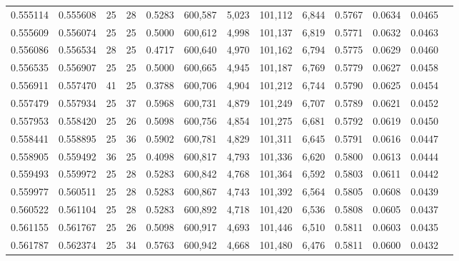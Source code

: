 \begin{tabular}{rrrrrrrrrrrrr}
0.555114 & 0.555608 &    25 &  28 &                                     0.5283 & 600,587 &   5,023 & 101,112 &   6,844 & 0.5767 & 0.0634 & 0.0465 \\
0.555609 & 0.556074 &    25 &  25 &                                     0.5000 & 600,612 &   4,998 & 101,137 &   6,819 & 0.5771 & 0.0632 & 0.0463 \\
0.556086 & 0.556534 &    28 &  25 &                                     0.4717 & 600,640 &   4,970 & 101,162 &   6,794 & 0.5775 & 0.0629 & 0.0460 \\
0.556535 & 0.556907 &    25 &  25 &                                     0.5000 & 600,665 &   4,945 & 101,187 &   6,769 & 0.5779 & 0.0627 & 0.0458 \\
0.556911 & 0.557470 &    41 &  25 &                                     0.3788 & 600,706 &   4,904 & 101,212 &   6,744 & 0.5790 & 0.0625 & 0.0454 \\
0.557479 & 0.557934 &    25 &  37 &                                     0.5968 & 600,731 &   4,879 & 101,249 &   6,707 & 0.5789 & 0.0621 & 0.0452 \\
0.557953 & 0.558420 &    25 &  26 &                                     0.5098 & 600,756 &   4,854 & 101,275 &   6,681 & 0.5792 & 0.0619 & 0.0450 \\
0.558441 & 0.558895 &    25 &  36 &                                     0.5902 & 600,781 &   4,829 & 101,311 &   6,645 & 0.5791 & 0.0616 & 0.0447 \\
0.558905 & 0.559492 &    36 &  25 &                                     0.4098 & 600,817 &   4,793 & 101,336 &   6,620 & 0.5800 & 0.0613 & 0.0444 \\
0.559493 & 0.559972 &    25 &  28 &                                     0.5283 & 600,842 &   4,768 & 101,364 &   6,592 & 0.5803 & 0.0611 & 0.0442 \\
0.559977 & 0.560511 &    25 &  28 &                                     0.5283 & 600,867 &   4,743 & 101,392 &   6,564 & 0.5805 & 0.0608 & 0.0439 \\
0.560522 & 0.561104 &    25 &  28 &                                     0.5283 & 600,892 &   4,718 & 101,420 &   6,536 & 0.5808 & 0.0605 & 0.0437 \\
0.561155 & 0.561767 &    25 &  26 &                                     0.5098 & 600,917 &   4,693 & 101,446 &   6,510 & 0.5811 & 0.0603 & 0.0435 \\
0.561787 & 0.562374 &    25 &  34 &                                     0.5763 & 600,942 &   4,668 & 101,480 &   6,476 & 0.5811 & 0.0600 & 0.0432 \\

\end{tabular}
